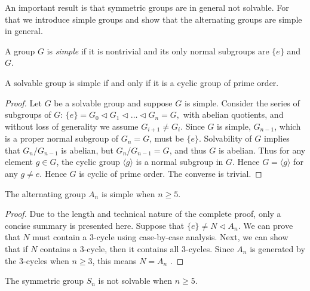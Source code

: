 An important result is that symmetric groups are in general not solvable.
For that we introduce simple groups and show that the alternating groups are simple in general. 

\begin{definition}
	A group $G$ is \textit{simple} if it is nontrivial and its only normal subgroups are $\{ e \}$ and $G$. 
\end{definition}

\begin{theorem} \label{thm:soluble-and-simple}
	A solvable group is simple if and only if it is a cyclic group of prime order.
\end{theorem}

\begin{proof}
	Let $G$ be a solvable group and suppose $G$ is simple. Consider the series of subgroups of $G$: 
	$
	\{ e \}=G_0 \triangleleft G_1 \triangleleft \ldots \triangleleft G_n=G,
	$
	with abelian quotients, and without loss of generality we assume $G_{i+1} \neq G_i$. Since $G$ is simple, $G_{n-1}$, which is a proper normal subgroup of $G_n = G$, must be $\{ e \}$. Solvability of $G$ implies that $G_n / G_{n -1 }$ is abelian, but $G_n / G_{n - 1} = G$, and thus $G$ is abelian. Thus for any element $g \in G$, the cyclic group $\langle g\rangle$ is a normal subgroup in $G$. Hence  $G = \langle g\rangle$ for any $g \neq e$. Hence $G$ is cyclic of prime order.
	The converse is trivial.
\end{proof}


\begin{theorem} \label{thm:simple-alternating}
	The alternating group $A_n$ is simple when $n \ge 5$. 
\end{theorem}

\begin{proof}
	Due to the length and technical nature of the complete proof, only a concise summary is presented here. 
	Suppose that $\{ e \} \neq N \triangleleft A_n$. We can prove that $N$ must contain a $3$-cycle using case-by-case analysis. Next, we can show that if $N$ contains a $3$-cycle, then it contains all $3$-cycles. Since $A_n$ is generated by the $3$-cycles when $n \ge 3$, this means $N = A_n$ \cite[p.~164]{Stewart}.
\end{proof}

\begin{theorem} \label{thm:symmetric-not-soluble-appendix}
	The symmetric group $S_n$ is not solvable when $n \ge 5$. 
\end{theorem}

